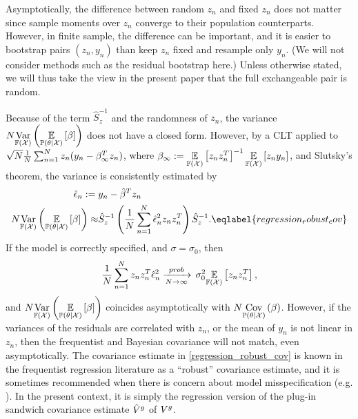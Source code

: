 Asymptotically, the difference between random $z_n$ and fixed $z_n$ does not
matter since sample moments over $z_n$ converge to their population
counterparts.  However, in finite sample, the difference can be important, and
it is easier to bootstrap pairs $(z_n, y_n)$ than keep $z_n$ fixed and resample
only $y_n$.  (We will not consider methods such as the residual bootstrap here.)
Unless otherwise stated, we will thus take the view in the present paper that
the full exchangeable pair is random.

Because of the term $\hat{S}_z^{-1}$ and the randomness of $z_n$, the variance
$N \underset{\mathbb{F}({\mathcal{X}})}{\mathrm{Var}}\left(\underset{\mathbb{P}(\theta | {\mathcal{X}})}{\mathbb{E}}\left[\beta\right]\right)$ does not have a closed form. However,
by a CLT applied to $\sqrt{N} \frac{1}{N}\sum_{n=1}^N z_n (y_n - \beta_\infty^T z_n)$, where
$\beta_\infty := \underset{\mathbb{F}({\mathcal{X}})}{\mathbb{E}}\left[z_n z_n^T\right]^{-1} \underset{\mathbb{F}({\mathcal{X}})}{\mathbb{E}}\left[z_n y_n\right]$,
and Slutsky's theorem, the variance is consistently estimated by
%
\begin{align}
%
\hat\epsilon_n :={}& y_n - \hat\beta^T z_n \nonumber\\
N \var{\xfdist}{\expect{\post}{\beta}} \approx&
    \hat{S}_z^{-1} \left(
        \meann \hat\epsilon_n^2 z_n z_n^T \right)
    \hat{S}_z^{-1}.
    \eqlabel{regression_robust_cov}
%
\end{align}
%
If the model is correctly specified, and $\sigma = \sigma_0$, then
%
\begin{align*}
%
\meann z_n z_n^T \hat\epsilon_n^2 \plim \sigma_0^2 \expect{\xfdist}{z_n z_n^T},
%
\end{align*}
%
and $N \underset{\mathbb{F}({\mathcal{X}})}{\mathrm{Var}}\left(\underset{\mathbb{P}(\theta | {\mathcal{X}})}{\mathbb{E}}\left[\beta\right]\right)$ coincides asymptotically with $N
\underset{\mathbb{P}(\theta | {\mathcal{X}})}{\mathrm{Cov}}\left(\beta\right)$.  However, if the variances of the residuals are correlated
with $z_n$, or the mean of $y_n$ is not linear in $z_n$, then the frequentist
and Bayesian covariance will not match, even asymptotically.  The covariance
estimate in \eqref{regression_robust_cov} is known in the frequentist regression
literature as a ``robust'' covariance estimate, and it is sometimes recommended
when there is concern about model misspecification (e.g. \cite[Section
5.5]{davidson:2004:econometric}).  In the present context, it is simply the
regression version of the plug-in sandwich covariance estimate $\hat{V}^{g}$ of
$V^g$.

